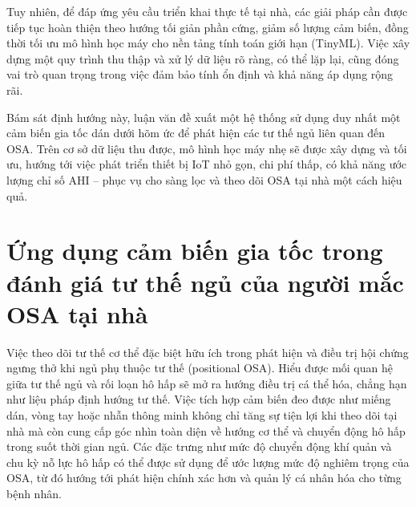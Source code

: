 Tuy nhiên, để đáp ứng yêu cầu triển khai thực tế tại nhà, các giải pháp cần được tiếp tục hoàn thiện theo hướng tối giản phần cứng, giảm số lượng cảm biến, đồng thời tối ưu mô hình học máy cho nền tảng tính toán giới hạn (TinyML). Việc xây dựng một quy trình thu thập và xử lý dữ liệu rõ ràng, có thể lặp lại, cũng đóng vai trò quan trọng trong việc đảm bảo tính ổn định và khả năng áp dụng rộng rãi.

Bám sát định hướng này, luận văn đề xuất một hệ thống sử dụng duy nhất một cảm biến gia tốc dán dưới hõm ức để phát hiện các tư thế ngủ liên quan đến OSA. Trên cơ sở dữ liệu thu được, mô hình học máy nhẹ sẽ được xây dựng và tối ưu, hướng tới việc phát triển thiết bị IoT nhỏ gọn, chi phí thấp, có khả năng ước lượng chỉ số AHI – phục vụ cho sàng lọc và theo dõi OSA tại nhà một cách hiệu quả.


\section{Ứng dụng cảm biến gia tốc trong đánh giá tư thế ngủ của người mắc OSA tại nhà}

Việc theo dõi tư thế cơ thể đặc biệt hữu ích trong phát hiện 
và điều trị hội chứng ngưng thở khi ngủ phụ thuộc tư thế (positional OSA).
Hiểu được mối quan hệ giữa tư thế ngủ và rối loạn hô hấp sẽ mở ra hướng điều trị cá thể hóa, 
chẳng hạn như liệu pháp định hướng tư thế. 
Việc tích hợp cảm biến đeo được như miếng dán, vòng tay hoặc 
nhẫn thông minh không chỉ tăng sự tiện lợi khi theo dõi tại nhà mà còn cung cấp góc 
nhìn toàn diện về hướng cơ thể và chuyển động hô hấp trong suốt thời gian ngủ. 
Các đặc trưng như mức độ chuyển động khí quản và chu kỳ nỗ lực hô hấp 
có thể được sử dụng để ước lượng mức độ nghiêm trọng của OSA, 
từ đó hướng tới phát hiện chính xác hơn và quản lý cá nhân hóa cho từng bệnh nhân.

